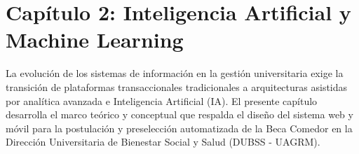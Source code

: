 
\newpage
\section{Capítulo 2: Inteligencia Artificial y Machine Learning}\label{cap:tecnologias}

La evolución de los sistemas de información en la gestión universitaria exige la transición de plataformas transaccionales tradicionales a arquitecturas asistidas por analítica avanzada e Inteligencia Artificial (IA). El presente capítulo desarrolla el marco teórico y conceptual que respalda el diseño del sistema web y móvil para la postulación y preselección automatizada de la Beca Comedor en la Dirección Universitaria de Bienestar Social y Salud (DUBSS - UAGRM).








